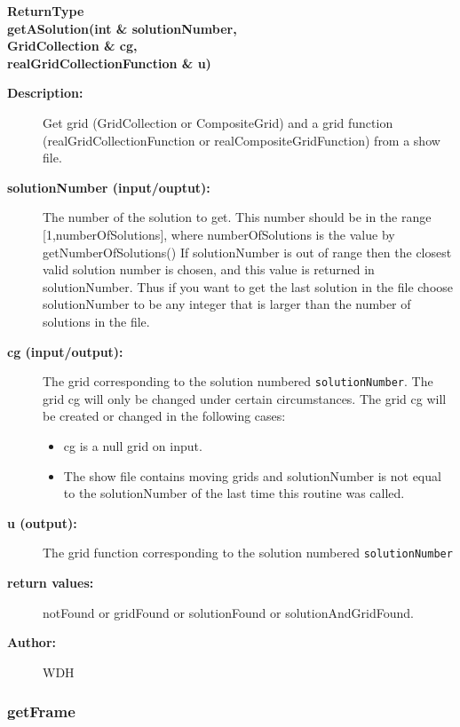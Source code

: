  
\begin{flushleft} \textbf{%
ReturnType  \\ 
\settowidth{\ShowFileReaderIncludeArgIndent}{getASolution(}%
getASolution(int \& solutionNumber,\\ 
\hspace{\ShowFileReaderIncludeArgIndent}GridCollection \& cg,\\ 
\hspace{\ShowFileReaderIncludeArgIndent}realGridCollectionFunction \& u)
}\end{flushleft}
\begin{description}
\item[{\bf Description:}] 
   Get grid (GridCollection or CompositeGrid) and a grid function (realGridCollectionFunction
   or realCompositeGridFunction) from a show file.
\item[{\bf solutionNumber (input/ouptut):}]  The number of the solution to get. This number should be
   in the range [1,numberOfSolutions], where numberOfSolutions is the value by getNumberOfSolutions()
   If solutionNumber is out of range then the closest valid solution number is chosen, and this value
   is returned in solutionNumber.  Thus if you want to get the last solution in the file choose
   solutionNumber to be any integer that is larger than the number of solutions in the file.
\item[{\bf cg (input/output):}]  The grid corresponding to the solution numbered {\tt solutionNumber}. 
    The grid cg will only be changed under certain circumstances. 
    The grid cg will be created or changed in the following cases:
    \begin{itemize}
      \item cg is a null grid on input.
      \item The show file contains moving grids and solutionNumber is not equal to the
            solutionNumber of the last time this routine was called.
    \end{itemize}
\item[{\bf u (output):}]  The grid function corresponding to the solution numbered {\tt solutionNumber}
\item[{\bf return values:}]  notFound or gridFound or solutionFound or solutionAndGridFound.
\item[{\bf Author:}]  WDH
\end{description}
\subsubsection{getFrame}
 

